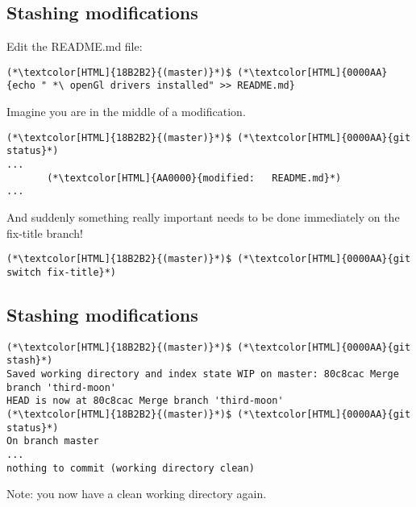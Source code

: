 \subsection{Stashing modifications}
\begin{frame}[fragile]
  \subslidetitle

  Edit the README.md file:
  \begin{lstlisting}
(*\textcolor[HTML]{18B2B2}{(master)}*)$ (*\textcolor[HTML]{0000AA}{echo " *\ openGl drivers installed" >> README.md}
\end{lstlisting}

  Imagine you are in the middle of a modification.

  \begin{lstlisting}
(*\textcolor[HTML]{18B2B2}{(master)}*)$ (*\textcolor[HTML]{0000AA}{git status}*)
...
       (*\textcolor[HTML]{AA0000}{modified:   README.md}*)
...
\end{lstlisting}

  \vspace{2em}
  And suddenly something really important needs to be done immediately on the fix-title branch! 

  \begin{lstlisting}
(*\textcolor[HTML]{18B2B2}{(master)}*)$ (*\textcolor[HTML]{0000AA}{git switch fix-title}*)
\end{lstlisting}
\end{frame}

\subsection{Stashing modifications}
\begin{frame}[fragile]
  \subslidetitle

  \begin{lstlisting}
(*\textcolor[HTML]{18B2B2}{(master)}*)$ (*\textcolor[HTML]{0000AA}{git stash}*)
Saved working directory and index state WIP on master: 80c8cac Merge branch 'third-moon'
HEAD is now at 80c8cac Merge branch 'third-moon'
(*\textcolor[HTML]{18B2B2}{(master)}*)$ (*\textcolor[HTML]{0000AA}{git status}*)
On branch master
...
nothing to commit (working directory clean)
\end{lstlisting}
  Note: you now have a clean working directory again.
\end{frame}

